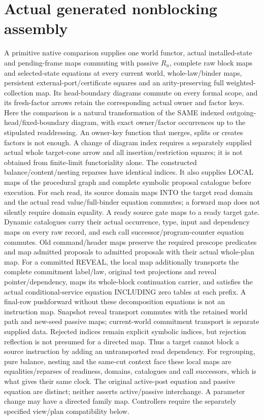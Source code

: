 \documentclass[11pt]{article}\usepackage{amsmath,amssymb,amsthm}
\begin{document}
\section{Actual generated nonblocking assembly}
A primitive native comparison supplies one world functor, actual installed-state and pending-frame maps commuting with passive $R_u$, complete raw block maps and selected-state equations at every current world, whole-law/binder maps, persistent external-port/certificate squares and an arity-preserving full weighted-collection map. Its head-boundary diagrams commute on every formal scope, and its fresh-factor arrows retain the corresponding actual owner and factor keys. Here the comparison is a natural transformation of the SAME indexed outgoing-head/fixed-boundary diagram, with exact owner/factor occurrences up to the stipulated readdressing. An owner-key function that merges, splits or creates factors is not enough. A change of diagram index requires a separately supplied actual whole target-cone arrow and all insertion/restriction squares; it is not obtained from finite-limit functoriality alone. The constructed balance/content/nesting reparses have identical indices. It also supplies LOCAL maps of the procedural graph and complete symbolic proposal catalogue before execution. For each read, its source domain maps INTO the target read domain and the actual read value/full-binder equation commutes; a forward map does not silently require domain equality. A ready source gate maps to a ready target gate. Dynamic catalogues carry their actual occurrence, type, input and dependency maps on every raw record, and each call successor/program-counter equation commutes. Old command/header maps preserve the required prescope predicates and map admitted proposals to admitted proposals with their actual whole-plan map. For a committed REVEAL, the local map additionally transports the complete commitment label/law, original test projections and reveal pointer/dependency, maps its whole-block continuation carrier, and satisfies the actual conditional-service equation INCLUDING zero tables at each prefix. A final-row pushforward without these decomposition equations is not an instruction map. Snapshot reveal transport commutes with the retained world path and new-seed passive maps; current-world commitment transport is separate supplied data. Rejected indices remain explicit symbolic indices, but rejection reflection is not presumed for a directed map. Thus a target cannot block a source instruction by adding an untransported read dependency. For regrouping, pure balance, nesting and the same-cut context face these local maps are equalities/reparses of readiness, domains, catalogues and call successors, which is what gives their same clock. The original active-post equation and passive equation are distinct; neither asserts active/passive interchange. A parameter change may have a directed family map. Controllers require the separately specified view/plan compatibility below.
\end{document}
